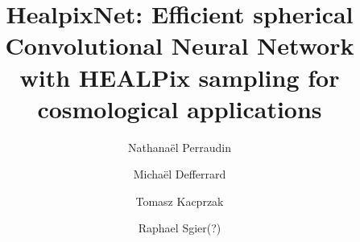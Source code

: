 \documentclass[final,twocolumn,3p,times,sort&compress]{elsarticle}
\newcommand{\1}{\b{1}}              %
\newcommand{\0}{\b{0}}              %
\begin{document}
\begin{frontmatter}



\title{HealpixNet: Efficient spherical Convolutional Neural Network with HEALPix sampling for cosmological applications}


\author[SDSC]{Nathanaël Perraudin}
\author[EPFL]{Michaël Defferrard}
\author[ETHZ]{Tomasz Kacprzak}
\author[ETHZ]{Raphael Sgier(?)}

\address[SDSC]{Swiss Data Science Center (SDSC), Zurich, Switzerland}
\address[EPFL]{Institute of Electrical Engineering, EPFL, Lausanne, Switzerland}
\address[ETHZ]{Institute for Particle Physics and Astrophysics, ETHZ, Zurich, Switzerland}

\begin{abstract}



\end{abstract}
\end{frontmatter}
\end{document}
